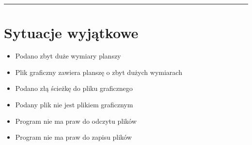 \documentclass[a4paper,11pt]{article}
\newcommand{\linia}{\rule{\linewidth}{0.4mm}}
\begin{document}
\noindent\linia
\section{Sytuacje wyjątkowe}
\begin{itemize}
\item Podano zbyt duże wymiary planszy
\item Plik graficzny zawiera planszę o zbyt dużych wymiarach
\item Podano złą ścieżkę do pliku graficznego
\item Podany plik nie jest plikiem graficznym
\item Program nie ma praw do odczytu plików 
\item Program nie ma praw do zapisu plików
\end{itemize}
\end{document}
